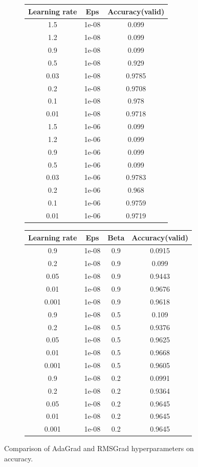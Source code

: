 \documentclass[12pt]{article}
\begin{document}
\begin{figure}[h]
\centering
\begin{subfigure}{.5\textwidth}
\centering
\begin{tabular}[h]{| c | c | c |}
\hline
Learning rate & Eps & Accuracy(valid) \\
\hline
1.5 & 1e-08 & 0.099 \\
\hline
1.2 & 1e-08 & 0.099 \\
\hline
0.9 & 1e-08 & 0.099 \\
\hline
0.5 & 1e-08 & 0.929 \\
\hline
0.03 & 1e-08 & 0.9785 \\
\hline
0.2 & 1e-08 & 0.9708 \\
\hline
0.1 & 1e-08 & 0.978 \\
\hline
0.01 & 1e-08 & 0.9718 \\
\hline
1.5 & 1e-06 & 0.099 \\
\hline
1.2 & 1e-06 & 0.099 \\
\hline
0.9 & 1e-06 & 0.099 \\
\hline
0.5 & 1e-06 & 0.099 \\
\hline
0.03 & 1e-06 & 0.9783 \\
\hline
0.2 & 1e-06 & 0.968 \\
\hline
0.1 & 1e-06 & 0.9759 \\
\hline
0.01 & 1e-06 & 0.9719 \\
\hline
\end{tabular}
\end{subfigure}%
\begin{subfigure}{.5\textwidth}

\centering
\begin{tabular}[h]{| c | c | c | c |}
\hline
Learning rate & Eps & Beta & Accuracy(valid) \\
\hline
0.9 & 1e-08 & 0.9 & 0.0915 \\
\hline
0.2 & 1e-08 & 0.9 & 0.099 \\
\hline
0.05 & 1e-08 & 0.9 & 0.9443 \\
\hline
0.01 & 1e-08 & 0.9 & 0.9676 \\
\hline
0.001 & 1e-08 & 0.9 & 0.9618 \\
\hline
0.9 & 1e-08 & 0.5 & 0.109 \\
\hline
0.2 & 1e-08 & 0.5 & 0.9376 \\
\hline
0.05 & 1e-08 & 0.5 & 0.9625 \\
\hline
0.01 & 1e-08 & 0.5 & 0.9668 \\
\hline
0.001 & 1e-08 & 0.5 & 0.9605 \\
\hline
0.9 & 1e-08 & 0.2 & 0.0991 \\
\hline
0.2 & 1e-08 & 0.2 & 0.9364 \\
\hline
0.05 & 1e-08 & 0.2 & 0.9645 \\
\hline
0.01 & 1e-08 & 0.2 & 0.9645 \\
\hline
0.001 & 1e-08 & 0.2 & 0.9645 \\
\hline
\end{tabular}
\end{subfigure}%

  \caption{Comparison of AdaGrad and RMSGrad hyperparameters on accuracy.}
  \label{fig:task3_table}
\end{figure}
\end{document}
